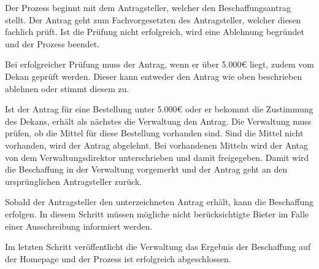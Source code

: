 Der Prozess beginnt mit dem Antragsteller, welcher den Beschaffungsantrag stellt.
Der Antrag geht zum Fachvorgesetzten des Antragsteller, welcher diesen fachlich prüft.
Ist die Prüfung nicht erfolgreich, wird eine Ablehnung begründet und der Prozess beendet.

Bei erfolgreicher Prüfung muss der Antrag, wenn er über 5.000€ liegt, zudem vom Dekan geprüft werden.
Dieser kann entweder den Antrag wie oben beschrieben ablehnen oder stimmt diesem zu.

Ist der Antrag für eine Bestellung unter 5.000€ oder er bekommt die Zustimmung des Dekans, erhält als nächstes die Verwaltung den Antrag.
Die Verwaltung muss prüfen, ob die Mittel für diese Bestellung vorhanden sind.
Sind die Mittel nicht vorhanden, wird der Antrag abgelehnt.
Bei vorhandenen Mitteln wird der Antag von dem Verwaltungsdirektor unterschrieben und damit freigegeben.
Damit wird die Beschaffung in der Verwaltung vorgemerkt und der Antrag geht an den ursprünglichen Antragsteller zurück.

Sobald der Antragsteller den unterzeichneten Antrag erhält, kann die Beschaffung erfolgen.
In diesem Schritt müssen mögliche nicht berücksichtigte Bieter im Falle einer Ausschreibung informiert werden.

Im letzten Schritt veröffentlicht die Verwaltung das Ergebnis der Beschaffung auf der Homepage und der Prozess ist erfolgreich abgeschlossen.
